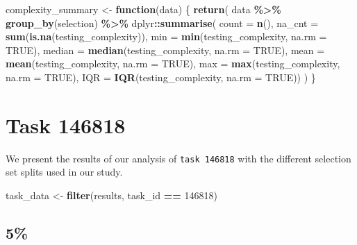 \documentclass[
]{book}
\newenvironment{Shaded}{\begin{snugshade}}{\end{snugshade}}
\newcommand{\AttributeTok}[1]{\textcolor[rgb]{0.13,0.29,0.53}{#1}}
\newcommand{\ConstantTok}[1]{\textcolor[rgb]{0.56,0.35,0.01}{#1}}
\newcommand{\ControlFlowTok}[1]{\textcolor[rgb]{0.13,0.29,0.53}{\textbf{#1}}}
\newcommand{\DecValTok}[1]{\textcolor[rgb]{0.00,0.00,0.81}{#1}}
\newcommand{\FunctionTok}[1]{\textcolor[rgb]{0.13,0.29,0.53}{\textbf{#1}}}
\newcommand{\NormalTok}[1]{#1}
\newcommand{\OtherTok}[1]{\textcolor[rgb]{0.56,0.35,0.01}{#1}}
\newcommand{\SpecialCharTok}[1]{\textcolor[rgb]{0.81,0.36,0.00}{\textbf{#1}}}
\begin{document}
\begin{Shaded}
\begin{Highlighting}[]
\NormalTok{complexity\_summary }\OtherTok{\textless{}{-}} \ControlFlowTok{function}\NormalTok{(data) \{}
    \FunctionTok{return}\NormalTok{(}
\NormalTok{        data }\SpecialCharTok{\%\textgreater{}\%}
        \FunctionTok{group\_by}\NormalTok{(selection) }\SpecialCharTok{\%\textgreater{}\%}
\NormalTok{        dplyr}\SpecialCharTok{::}\FunctionTok{summarise}\NormalTok{(}
            \AttributeTok{count =} \FunctionTok{n}\NormalTok{(),}
            \AttributeTok{na\_cnt =} \FunctionTok{sum}\NormalTok{(}\FunctionTok{is.na}\NormalTok{(testing\_complexity)),}
            \AttributeTok{min =} \FunctionTok{min}\NormalTok{(testing\_complexity, }\AttributeTok{na.rm =} \ConstantTok{TRUE}\NormalTok{),}
            \AttributeTok{median =} \FunctionTok{median}\NormalTok{(testing\_complexity, }\AttributeTok{na.rm =} \ConstantTok{TRUE}\NormalTok{),}
            \AttributeTok{mean =} \FunctionTok{mean}\NormalTok{(testing\_complexity, }\AttributeTok{na.rm =} \ConstantTok{TRUE}\NormalTok{),}
            \AttributeTok{max =} \FunctionTok{max}\NormalTok{(testing\_complexity, }\AttributeTok{na.rm =} \ConstantTok{TRUE}\NormalTok{),}
            \AttributeTok{IQR =} \FunctionTok{IQR}\NormalTok{(testing\_complexity, }\AttributeTok{na.rm =} \ConstantTok{TRUE}\NormalTok{))}
\NormalTok{    )}
\NormalTok{\}}
\end{Highlighting}
\end{Shaded}

\hypertarget{task-146818}{%
\chapter{Task 146818}\label{task-146818}}

We present the results of our analysis of \texttt{task\ 146818} with the different selection set splits used in our study.

\begin{Shaded}
\begin{Highlighting}[]
\NormalTok{task\_data }\OtherTok{\textless{}{-}} \FunctionTok{filter}\NormalTok{(results, task\_id }\SpecialCharTok{==} \DecValTok{146818}\NormalTok{)}
\end{Highlighting}
\end{Shaded}

\hypertarget{section}{%
\section{5\%}\label{section}}
\end{document}
